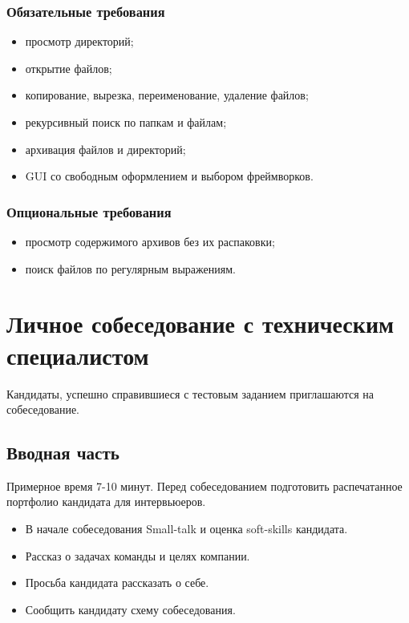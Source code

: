 \documentclass[a4paper,8pt]{article}
\begin{document}
\subsubsection*{Обязательные требования}

\begin{itemize}
    \item просмотр директорий;
    \item открытие файлов;
    \item копирование, вырезка, переименование, удаление файлов;
    \item рекурсивный поиск по папкам и файлам;
    \item архивация файлов и директорий;
    \item GUI со свободным оформлением и выбором фреймворков.
\end{itemize}

\subsubsection*{Опциональные требования}

\begin{itemize}
    \item просмотр содержимого архивов без их распаковки;
    \item поиск файлов по регулярным выражениям.
\end{itemize}

\section*{Личное собеседование с техническим специалистом}

Кандидаты, успешно справившиеся с тестовым заданием приглашаются на собеседование.

\subsection*{Вводная часть}

Примерное время 7-10 минут. Перед собеседованием подготовить распечатанное портфолио кандидата для интервьюеров. 

\begin{itemize}
    \item В начале собеседования Small-talk и оценка soft-skills кандидата.
    \item Рассказ о задачах команды и целях компании.
    \item Просьба кандидата рассказать о себе.
    \item Сообщить кандидату схему собеседования.
\end{itemize}
\end{document}
